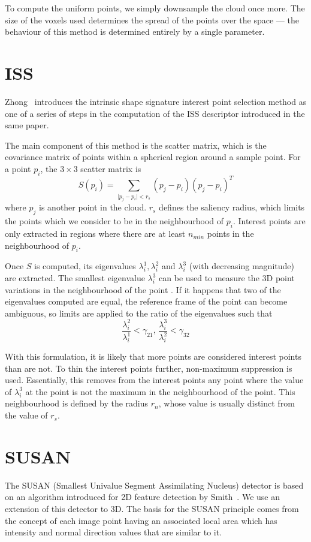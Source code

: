 \documentclass[11pt,a4paper]{kth-mag}
\begin{document}
To compute the uniform points, we simply downsample the cloud once more. The
size of the voxels used determines the spread of the points over the space ---
the behaviour of this method is determined entirely by a single parameter.
\section{ISS}
Zhong~\cite{zhong2009intrinsic} introduces the intrinsic shape signature
interest point selection method as one of a series of steps in the computation
of the ISS descriptor introduced in the same paper.

The main component of this method is the scatter matrix, which is the covariance
matrix of points within a spherical region around a sample point. For a point
$p_i$, the $3\times 3$ scatter matrix is
\begin{equation}
  \label{eq:4}
  S(p_i)=\sum_{\mid p_j - p_i \mid < r_s}(p_j-p_i)(p_j-p_i)^T
\end{equation}
where $p_j$ is another point in the cloud. $r_s$ defines the saliency radius,
which limits the points which we consider to be in the neighbourhood of $p_i$.
Interest points are only extracted in regions where there are at least $n_{min}$
points in the neighbourhood of $p_i$.

Once $S$ is computed, its eigenvalues $\lambda^1_i, \lambda^2_i$ and
$\lambda^3_i$ (with decreasing magnitude) are extracted. The smallest eigenvalue
$\lambda^3_i$ can be used to measure the 3D point variations in the
neighbourhood of the point \cite{zhong2009intrinsic}. If it happens that two of
the eigenvalues computed are equal, the reference frame of the point can become
ambiguous, so limits are applied to the ratio of the eigenvalues such that
\begin{equation}
  \label{eq:8}
  \frac{\lambda^2_i}{\lambda^1_i}< \gamma_{21},\, \frac{\lambda^3_i}{\lambda^2_i}< \gamma_{32}
\end{equation}

With this formulation, it is likely that more points are considered interest
points than are not. To thin the interest points further, non-maximum
suppression is used. Essentially, this removes from the interest points any
point where the value of $\lambda^3_i$ at the point is not the maximum in the
neighbourhood of the point. This neighbourhood is defined by the radius $r_{n}$,
whose value is usually distinct from the value of $r_s$.
\section{SUSAN}
The SUSAN (Smallest Univalue Segment Assimilating Nucleus) detector is based on
an algorithm introduced for 2D feature detection by Smith~\cite{smith1997susan}.
We use an extension of this detector to 3D. The basis for the SUSAN principle
comes from the concept of each image point having an associated local area which
has intensity and normal direction values that are similar to it.
\end{document}
